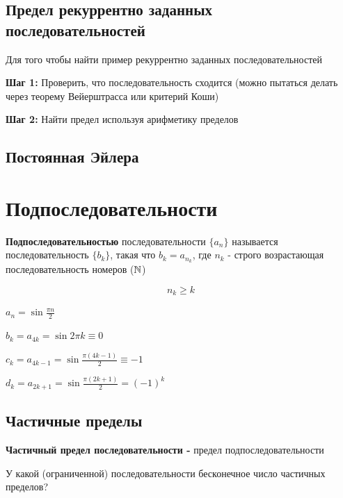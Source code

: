 \subsection{Предел рекуррентно заданных последовательностей}
Для того чтобы найти пример рекуррентно заданных последовательностей

\textbf{Шаг 1:} Проверить, что последовательность сходится (можно пытаться делать через теорему Вейерштрасса или критерий Коши)

\textbf{Шаг 2:} Найти предел используя арифметику пределов
\subsection{Постоянная Эйлера}

\section{Подпоследовательности}

\begin{definition}
    \textbf{Подпоследовательностью} последовательности $\{a_n\}$ называется последовательность $\{b_k\}$, такая что $b_k = a_{n_k}$, где $n_k$ - строго возрастающая последовательность номеров ($\mathbb{N}$)
\end{definition}

\begin{remark}[Замечание]
    $$ n_k \geq k $$
\end{remark}

\begin{example}
    $ a_n = \sin \frac{\pi n}{2} $

    $ b_k = a_{4k} = \sin 2\pi k \equiv 0$

    $ c_k = a_{4k - 1} = \sin \frac{\pi (4k - 1)}{2} \equiv -1$

    $ d_k = a_{2k + 1} = \sin \frac{\pi (2k + 1)}{2} = (-1)^k  $
\end{example}

\subsection{Частичные пределы}
\begin{definition}
    \textbf{Частичный предел последовательности -} предел подпоследовательности
\end{definition}

\begin{remark}
У какой (ограниченной) последовательности бесконечное число частичных пределов?
\end{remark}

